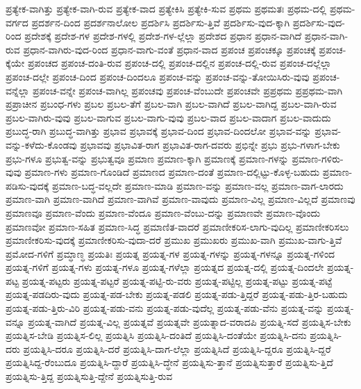 {ಪ್ರತ್ಯೇಕ-ವಾಗಿತ್ತು
ಪ್ರತ್ಯೇಕ-ವಾಗಿ-ರುವ
ಪ್ರತ್ಯೇಕ-ವಾದ
ಪ್ರತ್ಯೇಕಿಸಿ
ಪ್ರತ್ಯೇಕಿ-ಸುವ
ಪ್ರಥಮ
ಪ್ರಥಮತಃ
ಪ್ರಥಮ-ದಲ್ಲಿ
ಪ್ರಥಮ-ವರ್ಗದ
ಪ್ರದರ್ಶನ-ದಿಂದ
ಪ್ರದರ್ಶನಾಲೋಲ
ಪ್ರದರ್ಶಿಸಿ
ಪ್ರದರ್ಶಿಸು-ತ್ತಿವೆ
ಪ್ರದರ್ಶಿಸು-ವುದ-ಕ್ಕಾಗಿ
ಪ್ರದರ್ಶಿಸು-ವುದ-ರಿಂದ
ಪ್ರದೇಶಕ್ಕೆ
ಪ್ರದೇಶ-ಗಳ
ಪ್ರದೇಶ-ಗಳಲ್ಲಿ
ಪ್ರದೇಶ-ಗಳ-ಲ್ಲೆಲ್ಲಾ
ಪ್ರದೇಶದ
ಪ್ರಧಾನ
ಪ್ರಧಾನ-ವಾಗಿದೆ
ಪ್ರಧಾನ-ವಾಗಿ-ರುವ
ಪ್ರಧಾನ-ವಾಗಿರು-ವುದ-ರಿಂದ
ಪ್ರಧಾನ-ವಾಗು-ವಂತೆ
ಪ್ರಧಾನ-ವಾದ
ಪ್ರಪಂಚ
ಪ್ರಪಂಚಕ್ಕೂ
ಪ್ರಪಂಚಕ್ಕೆ
ಪ್ರಪಂಚ-ಕ್ಕೆಯೇ
ಪ್ರಪಂಚದ
ಪ್ರಪಂಚ-ದಂತಿ-ರುವ
ಪ್ರಪಂಚ-ದಲ್ಲಿ
ಪ್ರಪಂಚ-ದಲ್ಲಿನ
ಪ್ರಪಂಚ-ದಲ್ಲಿ-ರುವ
ಪ್ರಪಂಚ-ದಲ್ಲೆಲ್ಲಾ
ಪ್ರಪಂಚ-ದಲ್ಲೇ
ಪ್ರಪಂಚ-ದಿಂದ
ಪ್ರಪಂಚ-ದಿಂದಲೂ
ಪ್ರಪಂಚ-ವನ್ನು
ಪ್ರಪಂಚ-ವನ್ನು-ತೋಯಿಸಿರು-ವುವು
ಪ್ರಪಂಚ-ವನ್ನೆಲ್ಲಾ
ಪ್ರಪಂಚ-ವನ್ನೇ
ಪ್ರಪಂಚ-ವಾಗಿಲ್ಲ
ಪ್ರಪಂಚವು
ಪ್ರಪಂಚ-ವೆಂಬುದೇ
ಪ್ರಪಂಚವೇ
ಪ್ರಪ್ರಥಮ
ಪ್ರಪ್ರಥಮ-ವಾಗಿ
ಪ್ರಪ್ರಾಚೀನ
ಪ್ರಬಂಧ-ಗಳು
ಪ್ರಬಲ
ಪ್ರಬಲ-ತೆಗೆ
ಪ್ರಬಲ-ವಾಗಿ
ಪ್ರಬಲ-ವಾಗಿದೆ
ಪ್ರಬಲ-ವಾಗಿದ್ದ
ಪ್ರಬಲ-ವಾಗಿ-ರುವ
ಪ್ರಬಲ-ವಾಗಿರು-ವುವು
ಪ್ರಬಲ-ವಾಗುವ
ಪ್ರಬಲ-ವಾಗು-ವುವು
ಪ್ರಬಲ-ವಾದ
ಪ್ರಬಲ-ವಾದಾಗ
ಪ್ರಬಲ-ವಾದುದು
ಪ್ರಬುದ್ಧ-ರಾಗಿ
ಪ್ರಬುದ್ಧ-ವಾಗಿತ್ತು
ಪ್ರಭಾವ
ಪ್ರಭಾವಕ್ಕೆ
ಪ್ರಭಾವ-ದಿಂದ
ಪ್ರಭಾವ-ದಿಂದಲೋ
ಪ್ರಭಾವ-ವನ್ನು
ಪ್ರಭಾವ-ವನ್ನು-ಕಳೆದು-ಕೊಂಡವು
ಪ್ರಭಾವವು
ಪ್ರಭಾವಿತ-ರಾಗ
ಪ್ರಭಾವಿತ-ರಾಗ-ದವರು
ಪ್ರಭಿನ್ನೇ
ಪ್ರಭು
ಪ್ರಭು-ಗಳಾಗ-ಬೇಕು
ಪ್ರಭು-ಗಳೂ
ಪ್ರಭುತ್ವ-ವನ್ನು
ಪ್ರಭುತ್ವವೂ
ಪ್ರಮಾಣ
ಪ್ರಮಾಣ-ಕ್ಕಾಗಿ
ಪ್ರಮಾಣಕ್ಕೆ
ಪ್ರಮಾಣ-ಗಳನ್ನು
ಪ್ರಮಾಣ-ಗಳಿರು-ವುವು
ಪ್ರಮಾಣ-ಗಳು
ಪ್ರಮಾಣ-ಗೊಂಡಿದೆ
ಪ್ರಮಾಣದ
ಪ್ರಮಾಣ-ದಂತೆ
ಪ್ರಮಾಣ-ದಲ್ಲಿಟ್ಟು-ಕೊಳ್ಳ-ಬಹುದು
ಪ್ರಮಾಣ-ಪಡಿಸು-ವುದಕ್ಕೆ
ಪ್ರಮಾಣ-ಬದ್ಧ-ವಲ್ಲದೇ
ಪ್ರಮಾಣ-ಮಾಡಿ
ಪ್ರಮಾಣ-ವನ್ನು
ಪ್ರಮಾಣ-ವಲ್ಲ
ಪ್ರಮಾಣ-ವಾಗ-ಲಾರದು
ಪ್ರಮಾಣ-ವಾಗಿ
ಪ್ರಮಾಣ-ವಾಗಿದೆ
ಪ್ರಮಾಣ-ವಾಗಿವೆ
ಪ್ರಮಾಣ-ವಾವುದು
ಪ್ರಮಾಣ-ವಿಲ್ಲ
ಪ್ರಮಾಣ-ವಿಲ್ಲದೆ
ಪ್ರಮಾಣವು
ಪ್ರಮಾಣವೂ
ಪ್ರಮಾಣ-ವೆಂದು
ಪ್ರಮಾಣ-ವೆಂದೂ
ಪ್ರಮಾಣ-ವೆಂಬು-ದನ್ನು
ಪ್ರಮಾಣವೇ
ಪ್ರಮಾಣ-ವೊಂದು
ಪ್ರಮಾಣವೋ
ಪ್ರಮಾಣ-ಸಹಿತ
ಪ್ರಮಾಣ-ಸಿದ್ಧ
ಪ್ರಮಾಣಿತ-ವಾದರೆ
ಪ್ರಮಾಣೀಕರಿಸ-ಲಾಗು-ವುದಿಲ್ಲ
ಪ್ರಮಾಣೀಕರಿಸಲು
ಪ್ರಮಾಣೀಕರಿಸು-ವುದಕ್ಕೆ
ಪ್ರಮಾಣೀಕರಿಸು-ವುದಾ-ದರೆ
ಪ್ರಮುಖ
ಪ್ರಮುಖರು
ಪ್ರಮುಖ-ವಾಗಿ
ಪ್ರಮುಖ-ವಾಗು-ತ್ತಿವೆ
ಪ್ರಮೋದ-ಗಳಿಗೆ
ಪ್ರಮ್ಧಾಣ್ಧ
ಪ್ರಯತಿಃ
ಪ್ರಯತ್ನ
ಪ್ರಯತ್ನ-ಗಳ
ಪ್ರಯತ್ನ-ಗಳನ್ನು
ಪ್ರಯತ್ನ-ಗಳನ್ನೂ
ಪ್ರಯತ್ನ-ಗಳಿಂದ
ಪ್ರಯತ್ನ-ಗಳಿಗೆ
ಪ್ರಯತ್ನ-ಗಳು
ಪ್ರಯತ್ನ-ಗಳೂ
ಪ್ರಯತ್ನ-ಗಳೆಲ್ಲಾ
ಪ್ರಯತ್ನದ
ಪ್ರಯತ್ನ-ದಲ್ಲಿ
ಪ್ರಯತ್ನ-ದಿಂದಲೇ
ಪ್ರಯತ್ನ-ಪಟ್ಟ
ಪ್ರಯತ್ನ-ಪಟ್ಟರು
ಪ್ರಯತ್ನ-ಪಟ್ಟರೆ
ಪ್ರಯತ್ನ-ಪಟ್ಟಿ-ರು-ವರು
ಪ್ರಯತ್ನ-ಪಟ್ಟಿಲ್ಲ
ಪ್ರಯತ್ನ-ಪಟ್ಟು
ಪ್ರಯತ್ನ-ಪಟ್ಟೆ
ಪ್ರಯತ್ನ-ಪಡದಿರು-ವುದು
ಪ್ರಯತ್ನ-ಪಡ-ಬೇಕು
ಪ್ರಯತ್ನ-ಪಡಲಿ
ಪ್ರಯತ್ನ-ಪಡು-ತ್ತಿದ್ದರೆ
ಪ್ರಯತ್ನ-ಪಡು-ತ್ತಿರ-ಬಹುದು
ಪ್ರಯತ್ನ-ಪಡು-ತ್ತಿರು-ವಿರಿ
ಪ್ರಯತ್ನ-ಪಡು-ವನು
ಪ್ರಯತ್ನ-ಪಡು-ವುದೆಲ್ಲ
ಪ್ರಯತ್ನ-ಪಡು-ವೆನು
ಪ್ರಯತ್ನ-ವನ್ನು
ಪ್ರಯತ್ನ-ವನ್ನೂ
ಪ್ರಯತ್ನ-ವಾಗಿದೆ
ಪ್ರಯತ್ನ-ವಿಲ್ಲ
ಪ್ರಯತ್ನವೆ
ಪ್ರಯತ್ನವೇ
ಪ್ರಯತ್ನಾದ-ವರಾದಪಿ
ಪ್ರಯತ್ನಿ-ಸದೆ
ಪ್ರಯತ್ನಿಸ-ಬೇಕು
ಪ್ರಯತ್ನಿಸ-ಬೇಡಿ
ಪ್ರಯತ್ನಿಸ-ಲಿಲ್ಲ
ಪ್ರಯತ್ನಿಸಿ
ಪ್ರಯತ್ನಿಸಿ-ದಂತಿದೆ
ಪ್ರಯತ್ನಿಸಿ-ದಂತೆಯೇ
ಪ್ರಯತ್ನಿಸಿ-ದನು
ಪ್ರಯತ್ನಿಸಿ-ದರು
ಪ್ರಯತ್ನಿಸಿ-ದರೂ
ಪ್ರಯತ್ನಿಸಿ-ದರೆ
ಪ್ರಯತ್ನಿಸಿ-ದಾಗ-ಲೆಲ್ಲಾ
ಪ್ರಯತ್ನಿಸಿದೆ
ಪ್ರಯತ್ನಿಸಿ-ದ್ದರೂ
ಪ್ರಯತ್ನಿಸಿ-ದ್ದರೆ
ಪ್ರಯತ್ನಿಸಿದ್ದ-ರೆಂಬುದೂ
ಪ್ರಯತ್ನಿಸಿ-ದ್ದಾರೆ
ಪ್ರಯತ್ನಿಸಿ-ದ್ಧೇನೆ
ಪ್ರಯತ್ನಿಸು-ತ್ತಾನೆ
ಪ್ರಯತ್ನಿಸುತ್ತಾರೆ
ಪ್ರಯತ್ನಿಸು-ತ್ತಿದೆ
ಪ್ರಯತ್ನಿಸು-ತ್ತಿದ್ದ
ಪ್ರಯತ್ನಿಸುತ್ತಿ-ದ್ದೇನೆ
ಪ್ರಯತ್ನಿಸುತ್ತಿ-ರುವ
}

